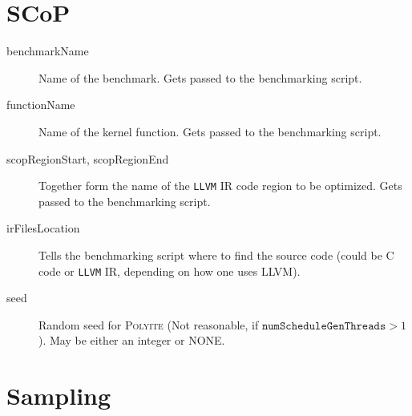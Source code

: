 \documentclass{article}
\begin{document}
\section{SCoP}

\begin{description}
  \item[benchmarkName] Name of the benchmark. Gets passed to the benchmarking
    script.
  \item[functionName] Name of the kernel function. Gets passed to the
    benchmarking script.
  \item[scopRegionStart, scopRegionEnd] Together form the name of the
    \texttt{LLVM} IR code region to be optimized. Gets passed to the
    benchmarking script.
  \item[irFilesLocation] Tells the benchmarking script where to find the source
    code (could be C code or \texttt{LLVM} IR, depending on how one uses LLVM).
  \item[seed] Random seed for \textsc{Polyite} (Not reasonable, if
    $\texttt{numScheduleGenThreads} > 1$). May be either an integer or NONE.
\end{description}

\section{Sampling}
\end{document}
